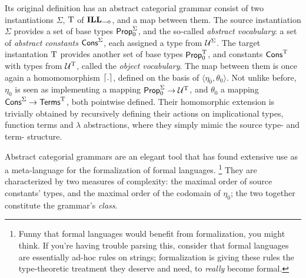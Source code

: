 Its original definition has an abstract categorial grammar consist of two instantiations $\Sigma$, $\mathrm{T}$ of $\ILL_{\li}$, and a map between them.
The source instantiation $\Sigma$ provides a set of base types $\mathsf{Prop}_0^{\Sigma}$, and the so-called \textit{abstract vocabulary}: a set of \textit{abstract constants} $\mathsf{Cons}^{\Sigma}$, each assigned a type from $\mathcal{U}^{\Sigma}$.
The target instantation $\mathrm{T}$ provides another set of base types $\mathsf{Prop}_0^{\mathrm{T}}$, and constants $\mathsf{Cons}^{\mathrm{T}}$ with types from $\mathcal{U}^{\mathrm{T}}$, called the \textit{object vocabulary}.
The map between them is once again a homomomorphism $\lceil{.}\rceil$, defined on the basis of $\langle \eta_0, \theta_0\rangle$.
Not unlike before, $\eta_0$ is seen as implementing a mapping $\mathsf{Prop}_0^{\Sigma} \to \mathcal{U}^{\mathrm{T}}$, and $\theta_0$ a mapping $\mathsf{Cons}^{\Sigma}\to \mathsf{Terms}^{\mathrm{T}}$, both pointwise defined.
Their homomorphic extension is trivially obtained by recursively defining their actions on implicational types, function terms and $\lambda$ abstractions, where they simply mimic the source type- and term- structure.

Abstract categorial grammars are an elegant tool that has found extensive use as a meta-language for the formalization of formal languages.%
\footnote{Funny that formal languages would benefit from formalization, you might think. If you're having trouble parsing this, consider that formal languages are essentially ad-hoc rules on strings; formalization is giving these rules the type-theoretic treatment they deserve and need, to \textit{really} become formal.}
They are characterized by two measures of complexity: the maximal order of source constants' types, and the maximal order of the codomain of $\eta_0$;
the two together constitute the grammar's \textit{class}.




